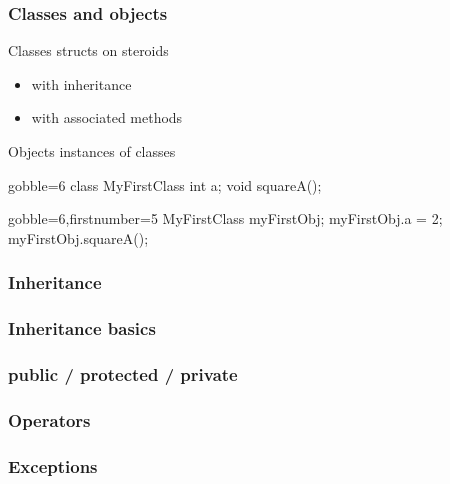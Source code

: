 \begin{frame}[fragile]
  \frametitle{Classes and objects}
  \begin{block}{Classes}
    structs on steroids
    \begin{itemize}
    \item with inheritance
    \item with associated methods
    \end{itemize}
  \end{block}
  \begin{block}{Objects}
    instances of classes
  \end{block}
  \pause
  \begin{multicols}{2}
    \begin{cppcode*}{gobble=6}
      class MyFirstClass {
        int a;
        void squareA();
      }
    \end{cppcode*}
    \columnbreak
    \pause
    \begin{cppcode*}{gobble=6,firstnumber=5}
      MyFirstClass myFirstObj;
      myFirstObj.a = 2;
      myFirstObj.squareA();
    \end{cppcode*}
  \end{multicols}
\end{frame}


\subsubsection{Inheritance}

\begin{frame}[fragile]
  \frametitle{Inheritance basics}
\end{frame}

\begin{frame}[fragile]
  \frametitle{public / protected / private}
\end{frame}

\subsubsection{Operators}
\subsubsection{Exceptions}
